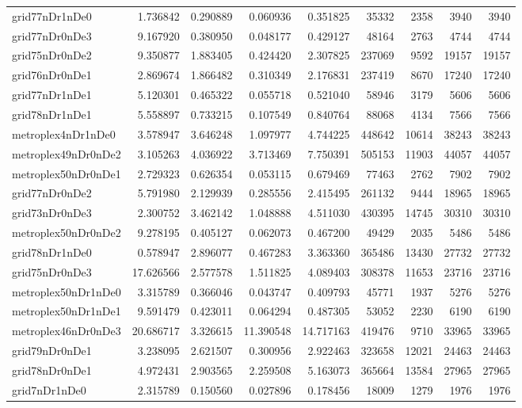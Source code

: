 \begin{longtable}{|l|r|r|r|r|r|r|r|r|}
grid77nDr1nDe0 & 1.736842 & 0.290889 & 0.060936 & 0.351825 & 35332 & 2358 & 3940 & 3940 \\
grid77nDr0nDe3 & 9.167920 & 0.380950 & 0.048177 & 0.429127 & 48164 & 2763 & 4744 & 4744 \\
grid75nDr0nDe2 & 9.350877 & 1.883405 & 0.424420 & 2.307825 & 237069 & 9592 & 19157 & 19157 \\
grid76nDr0nDe1 & 2.869674 & 1.866482 & 0.310349 & 2.176831 & 237419 & 8670 & 17240 & 17240 \\
grid77nDr1nDe1 & 5.120301 & 0.465322 & 0.055718 & 0.521040 & 58946 & 3179 & 5606 & 5606 \\
grid78nDr1nDe1 & 5.558897 & 0.733215 & 0.107549 & 0.840764 & 88068 & 4134 & 7566 & 7566 \\
metroplex4nDr1nDe0 & 3.578947 & 3.646248 & 1.097977 & 4.744225 & 448642 & 10614 & 38243 & 38243 \\
metroplex49nDr0nDe2 & 3.105263 & 4.036922 & 3.713469 & 7.750391 & 505153 & 11903 & 44057 & 44057 \\
metroplex50nDr0nDe1 & 2.729323 & 0.626354 & 0.053115 & 0.679469 & 77463 & 2762 & 7902 & 7902 \\
grid77nDr0nDe2 & 5.791980 & 2.129939 & 0.285556 & 2.415495 & 261132 & 9444 & 18965 & 18965 \\
grid73nDr0nDe3 & 2.300752 & 3.462142 & 1.048888 & 4.511030 & 430395 & 14745 & 30310 & 30310 \\
metroplex50nDr0nDe2 & 9.278195 & 0.405127 & 0.062073 & 0.467200 & 49429 & 2035 & 5486 & 5486 \\
grid78nDr1nDe0 & 0.578947 & 2.896077 & 0.467283 & 3.363360 & 365486 & 13430 & 27732 & 27732 \\
grid75nDr0nDe3 & 17.626566 & 2.577578 & 1.511825 & 4.089403 & 308378 & 11653 & 23716 & 23716 \\
metroplex50nDr1nDe0 & 3.315789 & 0.366046 & 0.043747 & 0.409793 & 45771 & 1937 & 5276 & 5276 \\
metroplex50nDr1nDe1 & 9.591479 & 0.423011 & 0.064294 & 0.487305 & 53052 & 2230 & 6190 & 6190 \\
metroplex46nDr0nDe3 & 20.686717 & 3.326615 & 11.390548 & 14.717163 & 419476 & 9710 & 33965 & 33965 \\
grid79nDr0nDe1 & 3.238095 & 2.621507 & 0.300956 & 2.922463 & 323658 & 12021 & 24463 & 24463 \\
grid78nDr0nDe1 & 4.972431 & 2.903565 & 2.259508 & 5.163073 & 365664 & 13584 & 27965 & 27965 \\
grid7nDr1nDe0 & 2.315789 & 0.150560 & 0.027896 & 0.178456 & 18009 & 1279 & 1976 & 1976 \\

\end{longtable}
